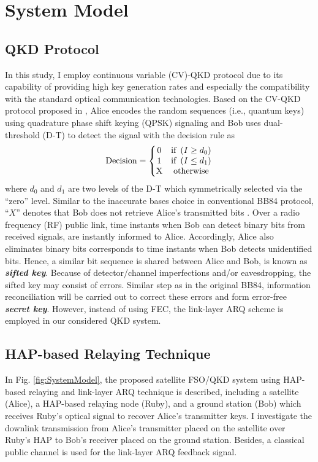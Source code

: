 \documentclass[conference]{IEEEtran}
\begin{document}
\section{System Model}
\label{sect:SystemModell}
\subsection{QKD Protocol}
\label{QKD}
In this study, I employ continuous variable (CV)-QKD protocol due to its capability of providing high key generation rates and especially the compatibility with the standard optical communication technologies. Based on the CV-QKD protocol proposed in \cite{MinhVu2019}, Alice encodes the random sequences (i.e., quantum keys) using quadrature phase shift keying (QPSK) signaling and Bob uses dual-threshold (D-T) to detect the signal with the decision rule as
\begin{align}
\label{decision}
\textnormal{Decision}=\left\{\begin{matrix}
$0$ & \textnormal{if}~\left ( I\geq d_{0} \right )\\ 
$1$ & \textnormal{if}~\left ( I\leq d_{1} \right )\\ 
$X$ & \textnormal{otherwise}
\end{matrix}\right.
\end{align}
where $d_0$ and $d_1$ are two levels of the D-T which symmetrically selected via the \enquote{zero} level. Similar to the inaccurate bases choice in conventional BB84 protocol, \enquote{$X$} denotes that Bob does not retrieve Alice's transmitted bits \cite{Bennett1984}. Over a radio frequency (RF) public link, time instants when Bob can detect binary bits from received signals, are instantly informed to Alice. Accordingly, Alice also eliminates binary bits corresponds to time instants when Bob detects unidentified bits. Hence, a similar bit sequence is shared between Alice and Bob, is known as \textbf{\textit{sifted key}}. Because of detector/channel imperfections and/or eavesdropping, the sifted key may consist of errors. Similar step as in the original BB84, information reconciliation will be carried out to correct these errors and form error-free \textbf{\textit{secret key}}. However, instead of using FEC, the link-layer ARQ scheme is employed in our considered QKD system. 

\subsection{HAP-based Relaying Technique}
In Fig. \ref{fig:SystemModel}, the proposed satellite FSO/QKD system using HAP-based relaying and link-layer ARQ technique is described, including a satellite (Alice), a HAP-based relaying node (Ruby), and a ground station (Bob) which receives Ruby's optical signal to recover Alice's transmitter keys. I investigate the downlink transmission from Alice's transmitter placed on the satellite over Ruby's HAP to Bob's receiver placed on the ground station. Besides, a classical public channel is used for the link-layer ARQ feedback signal.
\end{document}
